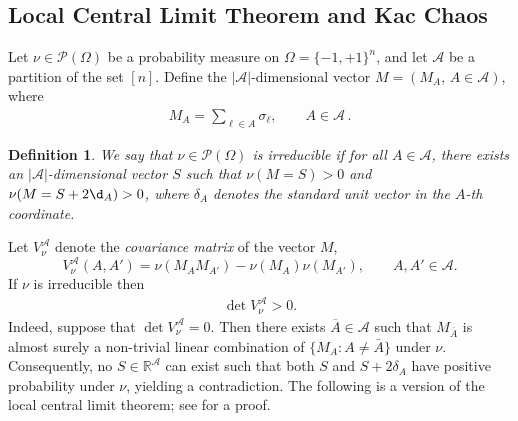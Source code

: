 \documentclass[11pt,reqno]{amsart}
\numberwithin{equation}{section}
\numberwithin{figure}{section}
\newtheorem{definition}[theorem]{Definition}
\newcommand{\1}{\mathds{1}}
\newcommand{\cA}{\ensuremath{\mathcal A}}
\begin{document}
\subsection{Local Central Limit Theorem and Kac Chaos}
Let \(\nu \in \mathcal{P}(\Omega)\) be a probability measure on \(\Omega = \{-1, +1\}^n\), and let \(\mathcal{A} \) be a partition of the set \([n]\). Define the \(|\mathcal{A}|\)-dimensional vector $M=(M_A, \,A\in\cA)$, where
\begin{align*}
M_A= %
\sum_{\ell \in A} \sigma_\ell, \qquad  A\in\cA\,.
\end{align*}
\begin{definition}\label{def:irred}
We say that $\nu\in \mathcal{P}(\Omega)$ is {\em irreducible} if for all $A\in\cA$, there exists an \(|\mathcal{A}|\)-dimensional vector $S$ such that 
$\nu(M = S)>0$ and $\nu(M = S+2\d_A)>0$, where 
\(\delta_A\) denotes the standard unit vector in the \(A\)-th coordinate. 
\end{definition}
Let \(V_\nu^\mathcal{A}\) denote the \textit{covariance matrix} of the vector \(M\), 
\begin{equation}
    V_\nu^\mathcal{A}(A, A') = \nu(M_A M_{A'}) - \nu(M_A)\nu(M_{A'}), \qquad A, A' \in \mathcal{A}.
\end{equation}
If $\nu$ is irreducible then %
\begin{align*}
\det V_\nu^\mathcal{A} > 0.
\end{align*}
Indeed, suppose that \(\det V_\nu^\mathcal{A} = 0\). Then there exists \(\overline{A} \in \mathcal{A}\) such that \(M_{\overline{A}}\) is almost surely a non-trivial linear combination of \(\{M_A : A\neq \bar{A}\}\) under \(\nu\). Consequently, no \(S \in \mathbb{R}^{\mathcal{A}}\) can exist such that both \(S\) and \(S + 2\delta_{A}\) have positive probability under \(\nu\), yielding a contradiction.
The following is a version of the local central limit theorem; see \cite[Proposition 2.2]{CP2024nonlinear} for a proof.
\end{document}
